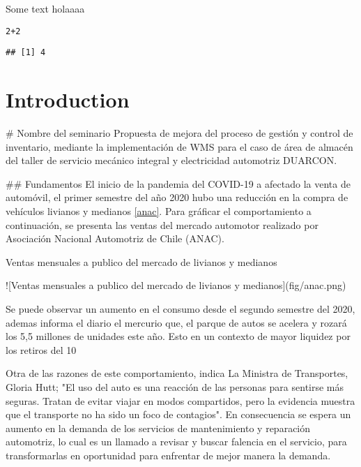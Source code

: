 \documentclass{article}\usepackage[]{graphicx}\usepackage[]{xcolor}
\makeatletter
\newcommand{\hlnum}[1]{\textcolor[rgb]{0.686,0.059,0.569}{#1}}%
\newcommand{\hlopt}[1]{\textcolor[rgb]{0,0,0}{#1}}%
\newenvironment{kframe}{%
 \def\at@end@of@kframe{}%
 \ifinner\ifhmode%
  \def\at@end@of@kframe{\end{minipage}}%
  \begin{minipage}{\columnwidth}%
 \fi\fi%
 \def\FrameCommand##1{\hskip\@totalleftmargin \hskip-\fboxsep
 \colorbox{shadecolor}{##1}\hskip-\fboxsep
     \hskip-\linewidth \hskip-\@totalleftmargin \hskip\columnwidth}%
 \MakeFramed {\advance\hsize-\width
   \@totalleftmargin\z@ \linewidth\hsize
   \@setminipage}}%
 {\par\unskip\endMakeFramed%
 \at@end@of@kframe}
\newenvironment{knitrout}{}{} %
\makeatother
\begin{document}
Some text
holaaaa
\begin{knitrout}
\color{fgcolor}\begin{kframe}
\begin{alltt}
\hlnum{2}\hlopt{+}\hlnum{2}
\end{alltt}
\begin{verbatim}
## [1] 4
\end{verbatim}
\end{kframe}
\end{knitrout}
\section{Introduction}

# Nombre del seminario
Propuesta de mejora del proceso de gestión y control de inventario, mediante la implementación de WMS  para el caso de área de almacén del taller de servicio mecánico integral y electricidad automotriz DUARCON.

## Fundamentos
El inicio de la pandemia del COVID-19 a afectado la venta de automóvil, el primer semestre del año 2020 hubo una reducción en la compra de vehículos livianos y medianos \ref{anac}. Para gráficar el comportamiento a continuación, se presenta las ventas del mercado automotor realizado por Asociación Nacional Automotriz de Chile (ANAC).

Ventas mensuales a publico del mercado de livianos y medianos

![Ventas mensuales a publico del mercado de livianos y medianos\label{anac}](fig/anac.png)

Se puede observar un aumento en el consumo desde el segundo semestre del 2020, ademas informa el diario el mercurio que, el parque de autos se acelera y rozará los 5,5 millones de unidades este año. Esto en un contexto de mayor liquidez por los retiros del 10%

Otra de las razones de este comportamiento, indica La Ministra de Transportes, Gloria Hutt; "El uso del auto es una reacción de las personas para sentirse más seguras. Tratan de evitar viajar en modos compartidos, pero la evidencia muestra que el transporte no ha sido un foco de contagios". En consecuencia se espera un aumento en la demanda de los servicios de mantenimiento y reparación automotriz, lo cual es un llamado a revisar y buscar falencia en el servicio, para transformarlas en oportunidad para enfrentar de mejor manera la demanda.
\end{document}
